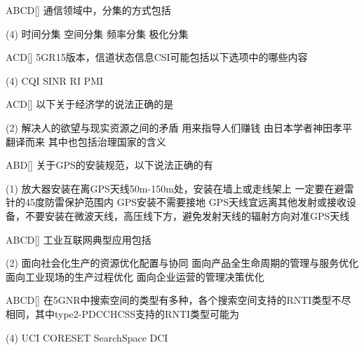 \begin{choice}{\;ABCD\;}[]
    通信领域中，分集的方式包括
    \begin{tasks}(4)
        \task 时间分集
        \task 空间分集
        \task 频率分集
        \task 极化分集
    \end{tasks}
\end{choice}


\begin{choice}{\;ACD\;}[]
    5G\;R15版本，信道状态信息CSI可能包括以下选项中的哪些内容
    \begin{tasks}(4)
        \task CQI
        \task SINR
        \task RI
        \task PMI
    \end{tasks}
\end{choice}


\begin{choice}{\;ACD\;}[]
    以下关于经济学的说法正确的是
    \begin{tasks}(2)
        \task 解决人的欲望与现实资源之间的矛盾
        \task 用来指导人们赚钱
        \task 由日本学者神田孝平翻译而来
        \task 其中也包括治理国家的含义
    \end{tasks}
\end{choice}

\begin{choice}{\;ABD\;}[]
    关于GPS的安装规范，以下说法正确的有
    \begin{tasks}(1)
        \task 放大器安装在离GPS天线50m-150m处，安装在墙上或走线架上
        \task 一定要在避雷针的45度防雷保护范围内
        \task GPS安装不需要接地
        \task GPS天线宜远离其他发射或接收设备，不要安装在微波天线，高压线下方，避免发射天线的辐射方向对准GPS天线
    \end{tasks}
\end{choice}

\begin{choice}{\;ABCD\;}[]
    工业互联网典型应用包括
    \begin{tasks}(2)
        \task 面向社会化生产的资源优化配置与协同
        \task 面向产品全生命周期的管理与服务优化
        \task 面向工业现场的生产过程优化
        \task 面向企业运营的管理决策优化
    \end{tasks}
\end{choice}

\begin{choice}{\;ABCD\;}[]
    在5G\;NR中搜索空间的类型有多种，各个搜索空间支持的RNTI类型不尽相同，其中type2-PDCCH\;CSS支持的RNTI类型可能为
    \begin{tasks}(4)
        \task UCI
        \task CORESET
        \task Search\;Space
        \task DCI
    \end{tasks}
\end{choice}


